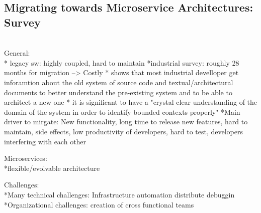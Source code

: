 \subsection{Migrating towards Microservice Architectures: Survey}
\cite{MigratingTowardsSurvey} \\

General:\\
* legacy sw: highly coupled, hard to maintain
*industrial survey: roughly 28 months for migration --> Costly
* shows that most industrial develloper get inforamtion about the old system of source code and textual/architectural documents to better understand the pre-existing system and to be able to architect a new one
* it is significant to have a "crystal clear understanding of the domain of the system in order to identify bounded contexts properly"
*Main driver to mirgate: New functionality, long time to release new features, hard to maintain, side effects, low productivity of developers, hard to test, developers interfering with each other


Microservices:\\
*flexible/evolvable architecture


Challenges:\\
*Many technical challenges: Infrastructure automation distribute debuggin
*Organizational challenges: creation of cross functional teams


